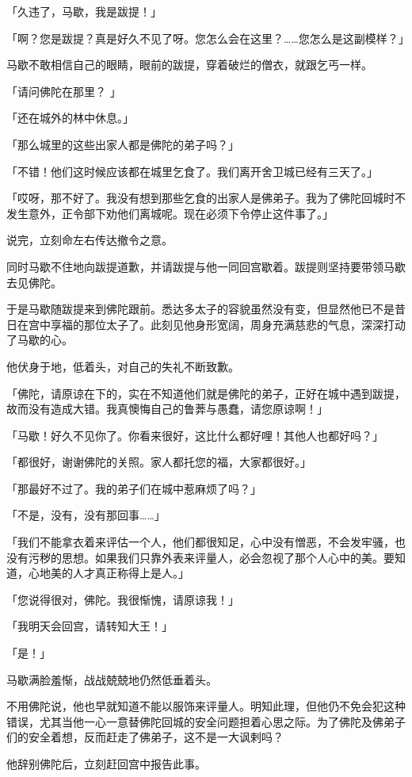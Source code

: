 \documentclass[twoside,openany]{book}
\begin{document}
「久违了，马歇，我是跋提！」

「啊？您是跋提？真是好久不见了呀。您怎么会在这里？……您怎么是这副模样？」

马歇不敢相信自己的眼睛，眼前的跋提，穿着破烂的僧衣，就跟乞丐一样。

「请问佛陀在那里？	」

「还在城外的林中休息。」

「那么城里的这些出家人都是佛陀的弟子吗？」

「不错！他们这时候应该都在城里乞食了。我们离开舍卫城已经有三天了。」

「哎呀，那不好了。我没有想到那些乞食的出家人是佛弟子。我为了佛陀回城时不发生意外，正令部下劝他们离城呢。现在必须下令停止这件事了。」

说完，立刻命左右传达撤令之意。

同时马歇不住地向跋提道歉，并请跋提与他一同回宫歇着。跋提则坚持要带领马歇去见佛陀。

于是马歇随跋提来到佛陀跟前。悉达多太子的容貌虽然没有变，但显然他已不是昔日在宫中享福的那位太子了。此刻见他身形宽阔，周身充满慈悲的气息，深深打动了马歇的心。

他伏身于地，低着头，对自己的失礼不断致歉。

「佛陀，请原谅在下的，实在不知道他们就是佛陀的弟子，正好在城中遇到跋提，故而没有造成大错。我真懊悔自己的鲁莾与愚蠢，请您原谅啊！」

「马歇！好久不见你了。你看来很好，这比什么都好哩！其他人也都好吗？」

「都很好，谢谢佛陀的关照。家人都托您的福，大家都很好。」

「那最好不过了。我的弟子们在城中惹麻烦了吗？」

「不是，没有，没有那回事……」

「我们不能拿衣着来评估一个人，他们都很知足，心中没有憎恶，不会发牢骚，也没有污秽的思想。如果我们只靠外表来评量人，必会忽视了那个人心中的美。要知道，心地美的人才真正称得上是人。」

「您说得很对，佛陀。我很惭愧，请原谅我！」

「我明天会回宫，请转知大王！」

「是！」

马歇满脸羞惭，战战兢兢地仍然低垂着头。

不用佛陀说，他也早就知道不能以服饰来评量人。明知此理，但他仍不免会犯这种错误，尤其当他一心一意替佛陀回城的安全问题担着心思之际。为了佛陀及佛弟子们的安全着想，反而赶走了佛弟子，这不是一大讽剌吗？

他辞别佛陀后，立刻赶回宫中报告此事。
\end{document}
